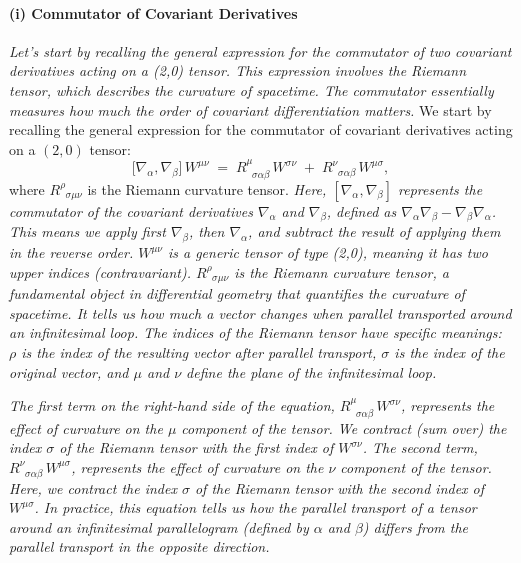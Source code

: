 \documentclass{article}
\begin{document}
\paragraph{(i) Commutator of Covariant Derivatives}
\textit{Let's start by recalling the general expression for the commutator of two covariant derivatives acting on a (2,0) tensor. This expression involves the Riemann tensor, which describes the curvature of spacetime. The commutator essentially measures how much the order of covariant differentiation matters.}
We start by recalling the general expression for the commutator of covariant derivatives acting on a $(2,0)$ tensor:
\[
\bigl[\nabla_{\alpha}, \nabla_{\beta}\bigr]\,W^{\mu\nu}
\;=\;
R^\mu_{\;\;\sigma\alpha\beta}\,W^{\sigma\nu}
\;+\;
R^\nu_{\;\;\sigma\alpha\beta}\,W^{\mu\sigma},
\]
where $R^\rho_{\;\;\sigma\mu\nu}$ is the Riemann curvature tensor.
\textit{Here, \([\nabla_{\alpha}, \nabla_{\beta}]\) represents the commutator of the covariant derivatives \(\nabla_{\alpha}\) and \(\nabla_{\beta}\), defined as \(\nabla_{\alpha}\nabla_{\beta} - \nabla_{\beta}\nabla_{\alpha}\). This means we apply first \(\nabla_{\beta}\), then \(\nabla_{\alpha}\), and subtract the result of applying them in the reverse order. \(W^{\mu\nu}\) is a generic tensor of type (2,0), meaning it has two upper indices (contravariant). \(R^\rho_{\;\;\sigma\mu\nu}\) is the Riemann curvature tensor, a fundamental object in differential geometry that quantifies the curvature of spacetime. It tells us how much a vector changes when parallel transported around an infinitesimal loop. The indices of the Riemann tensor have specific meanings: \(\rho\) is the index of the resulting vector after parallel transport, \(\sigma\) is the index of the original vector, and \(\mu\) and \(\nu\) define the plane of the infinitesimal loop.}

\textit{The first term on the right-hand side of the equation, \(R^\mu_{\;\;\sigma\alpha\beta}\,W^{\sigma\nu}\), represents the effect of curvature on the \(\mu\) component of the tensor. We contract (sum over) the index \(\sigma\) of the Riemann tensor with the first index of \(W^{\sigma\nu}\). The second term, \(R^\nu_{\;\;\sigma\alpha\beta}\,W^{\mu\sigma}\), represents the effect of curvature on the \(\nu\) component of the tensor. Here, we contract the index \(\sigma\) of the Riemann tensor with the second index of \(W^{\mu\sigma}\). In practice, this equation tells us how the parallel transport of a tensor around an infinitesimal parallelogram (defined by \(\alpha\) and \(\beta\)) differs from the parallel transport in the opposite direction.}
\end{document}
